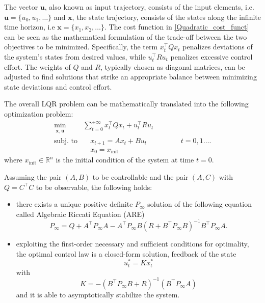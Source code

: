 \documentclass[a4paper,12pt,oneside]{book}
\begin{document}
The vector $\boldsymbol{u}$, also known as input trajectory, consists of the input elements, i.e. $\boldsymbol{u} = \{u_0, u_1, \dots\}$ and $\boldsymbol{x}$, the state trajectory, consists of the states along the infinite time horizon, i.e $\boldsymbol{x} = \{x_1, x_2, \dots\}$.
The cost function in \eqref{Quadratic_cost_funct} can be seen as the mathematical formulation of the trade-off between the two objectives to be minimized.
Specifically, the term $x_t^\top Q x_t$ penalizes deviations of the system's states from desired values, while $u_t^\top R u_t$ penalizes excessive control effort.
The weights of $Q$ and $R$, typically chosen as diagonal matrices, can be adjusted to find solutions that strike an appropriate balance between minimizing state deviations and control effort.

\bigskip
The overall LQR problem can be mathematically translated into the following optimization problem:
\begin{equation}
\begin{aligned}
	\min_{\substack{\boldsymbol{x}, \boldsymbol{u}}}\quad & \sum_{t=0}^{+\infty}  x_t ^\top Q x_t  + u_t^\top R u_t  \\
	\text{subj. to} & \quad x_{t+1}  = A x_t + B u_t \hspace{2cm} t = 0, 1 \ldots. \\
    & \quad x_0 = x_{\text{init}}
\end{aligned}
\label{eq:LQR_1}
\end{equation}
where  $x_{\text{init}} \in \mathbb{R}^n$ is the initial condition of the system at time $t=0$.



\bigskip
Assuming the pair $(A,B)$ to be controllable and the pair $(A,C)$ with $Q = C^\top C$ to be observable, the following holds:
\begin{itemize}
    \item there exists a unique positive definite $P_\infty$ solution of the following equation called Algebraic Riccati Equation (ARE)
    \begin{equation}
        P_\infty = Q + A^\top P_\infty A - A^\top P_\infty B (R + B^\top P_\infty B)^{-1} B^\top P_\infty A.
    \end{equation}
    \item exploiting the first-order necessary and sufficient conditions for optimality, the optimal control law is a closed-form solution, feedback of the state
    \begin{equation}
        u_t^* = K x_t^*
    \end{equation}
    with
    \begin{equation}
        K = -( B^\top P_\infty B + R)^{-1}(B^\top P_\infty A)
    \label{eq:Regulator_LQR}
    \end{equation}
    and it is able to asymptotically stabilize the system.
\end{itemize}
\end{document}
